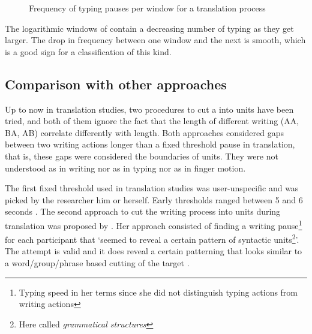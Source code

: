 \documentclass[output=paper]{LSP/langsci}
\begin{document}
\begin{figure}%
  \centering
  \caption{Frequency of typing pauses per window for a translation process}
  \label{couto:fig:TypingPausesPerWindow}
\end{figure}

The logarithmic windows of  contain a decreasing number of typing  as they get larger. The drop in  frequency between one window and the next is smooth, which is a good sign for a classification of this kind.

\subsection{Comparison with other approaches}
\label{couto:sec:ComparisonWithOtherApproaches}

Up to now in translation studies, two procedures to cut a  into units have been tried, and both of them ignore the fact that the length of different writing  (AA, BA, AB) correlate differently with  length. Both approaches considered gaps between two writing actions longer than a fixed threshold pause in translation, that is, these gaps were considered the boundaries of  units. They were not understood as  in writing nor as  in typing nor as  in finger motion.

The first fixed threshold used in translation studies was user-unspecific and was picked by the researcher him or herself. Early thresholds ranged between 5 and 6 seconds \citep{Hansen:1999wn,Hansen:2002wu,Alves:2003va,PACTE:2005vu}. The second approach to cut the writing process into units during translation was proposed by \citet{Dragsted:2004tj,Dragsted:2005vl}. Her approach consisted of finding a writing pause\footnote{Typing speed in her terms since she did not distinguish typing actions from writing actions} for each participant that `seemed to reveal a certain pattern of syntactic units\footnote{Here called \emph{grammatical structures}}'. The attempt is valid and it does reveal a certain patterning that looks similar to a word/group/phrase based cutting of the target .
\end{document}
